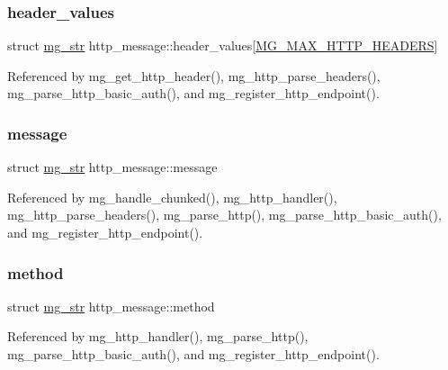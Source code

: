 \subsubsection{\texorpdfstring{header\+\_\+values}{header\_values}}
{\footnotesize\ttfamily struct \hyperlink{structmg__str}{mg\+\_\+str} http\+\_\+message\+::header\+\_\+values\mbox{[}\hyperlink{mongoose_8h_a12ec0f9dfd1ce08498bb2aeed8a80d40_a12ec0f9dfd1ce08498bb2aeed8a80d40}{M\+G\+\_\+\+M\+A\+X\+\_\+\+H\+T\+T\+P\+\_\+\+H\+E\+A\+D\+E\+RS}\mbox{]}}



Referenced by mg\+\_\+get\+\_\+http\+\_\+header(), mg\+\_\+http\+\_\+parse\+\_\+headers(), mg\+\_\+parse\+\_\+http\+\_\+basic\+\_\+auth(), and mg\+\_\+register\+\_\+http\+\_\+endpoint().

\mbox{\label{structhttp__message_a005f4310b3d6f7f2c818e4dff1c81d10_a005f4310b3d6f7f2c818e4dff1c81d10}} 
\subsubsection{\texorpdfstring{message}{message}}
{\footnotesize\ttfamily struct \hyperlink{structmg__str}{mg\+\_\+str} http\+\_\+message\+::message}



Referenced by mg\+\_\+handle\+\_\+chunked(), mg\+\_\+http\+\_\+handler(), mg\+\_\+http\+\_\+parse\+\_\+headers(), mg\+\_\+parse\+\_\+http(), mg\+\_\+parse\+\_\+http\+\_\+basic\+\_\+auth(), and mg\+\_\+register\+\_\+http\+\_\+endpoint().

\mbox{\label{structhttp__message_a446deffe0f2da170fb9216fd5c8812d2_a446deffe0f2da170fb9216fd5c8812d2}} 
\subsubsection{\texorpdfstring{method}{method}}
{\footnotesize\ttfamily struct \hyperlink{structmg__str}{mg\+\_\+str} http\+\_\+message\+::method}



Referenced by mg\+\_\+http\+\_\+handler(), mg\+\_\+parse\+\_\+http(), mg\+\_\+parse\+\_\+http\+\_\+basic\+\_\+auth(), and mg\+\_\+register\+\_\+http\+\_\+endpoint().

